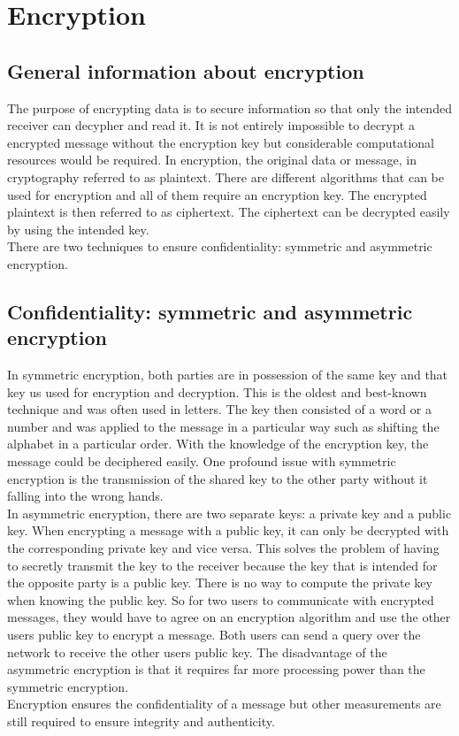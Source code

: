 \section*{Encryption}
\subsection*{General information about encryption}
The purpose of encrypting data is to secure information so that only the intended receiver can decypher and read it. It is not entirely impossible to decrypt a encrypted message without the encryption key but considerable computational resources would be required.
In encryption, the original data or message, in cryptography referred to as plaintext. There are different algorithms that can be used for encryption and all of them require an encryption key. The encrypted plaintext is then referred to as ciphertext. The ciphertext can be decrypted easily by using the intended key.\\
There are two techniques to ensure confidentiality: symmetric and asymmetric encryption.\\

\subsection*{Confidentiality: symmetric and asymmetric encryption}
In symmetric encryption, both parties are in possession of the same key and that key us used for encryption and decryption. This is the oldest and best-known technique and was often used in letters. The key then consisted of a word or a number and was applied to the message in a particular way such as shifting the alphabet in a particular order. With the knowledge of the encryption key, the message could be deciphered easily. One profound issue with symmetric encryption is the transmission of the shared key to the other party without it falling into the wrong hands.\\
In asymmetric encryption, there are two separate keys: a private key and a public key. When encrypting a message with a public key, it can only be decrypted with the corresponding private key and vice versa. This solves the problem of having to secretly transmit the key to the receiver because the key that is intended for the opposite party is a public key. There is no way to compute the private key when knowing the public key. So for two users to communicate with encrypted messages, they would have to agree on an encryption algorithm and use the other users public key to encrypt a message. Both users can send a query over the network to receive the other users public key. The disadvantage of the asymmetric encryption is that it requires far more processing power than the symmetric encryption.\\
Encryption ensures the confidentiality of a message but other measurements are still required to ensure integrity and authenticity.\\

